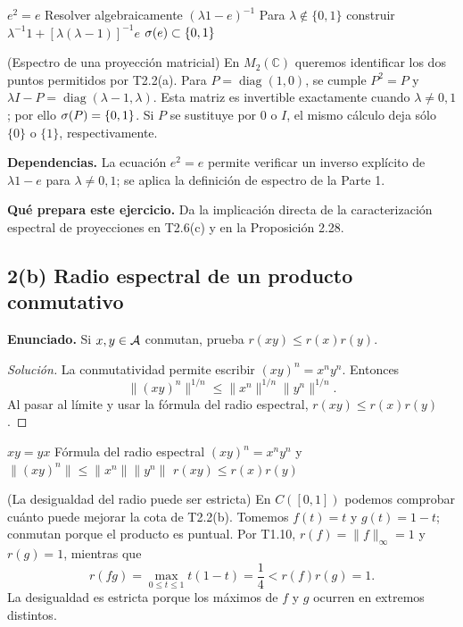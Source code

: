\pagebreak
\proofdiagram
{$e^2=e$}
{Resolver algebraicamente $(\lambda1-e)^{-1}$}
{Para $\lambda\notin\{0,1\}$ construir $\lambda^{-1}1+[\lambda(\lambda-1)]^{-1}e$}
{$\sigma(e)\subset\{0,1\}$}

\begin{cthejemplo}{(Espectro de una proyección matricial)}
En $M_2(\mathbb C)$ queremos identificar los dos puntos permitidos por T2.2(a).
Para $P=\operatorname{diag}(1,0)$, se cumple $P^2=P$ y
$\lambda I-P=\operatorname{diag}(\lambda-1,\lambda)$.
Esta matriz es invertible exactamente cuando $\lambda\ne0,1$; por ello
$\sigma(P)=\{0,1\}$. Si $P$ se sustituye por $0$ o $I$, el mismo cálculo deja sólo
$\{0\}$ o $\{1\}$, respectivamente.
\end{cthejemplo}

\noindent\textbf{Dependencias.} La ecuación $e^2=e$ permite verificar un inverso explícito de $\lambda1-e$ para $\lambda\ne0,1$; se aplica la definición de espectro de la Parte 1.

\noindent\textbf{Qué prepara este ejercicio.} Da la implicación directa de la caracterización espectral de proyecciones en T2.6(c) y en la Proposición 2.28.

\subsection*{2(b) Radio espectral de un producto conmutativo}

\noindent\textbf{Enunciado.} Si $x,y\in\mathcal A$ conmutan, prueba $r(xy)\le r(x)r(y)$.

\begin{proof}[Solución]
La conmutatividad permite escribir $(xy)^n=x^ny^n$. Entonces
\[
\|(xy)^n\|^{1/n}
\le\|x^n\|^{1/n}\|y^n\|^{1/n}.
\]
Al pasar al límite y usar la fórmula del radio espectral,
$r(xy)\le r(x)r(y)$.
\end{proof}

\proofdiagram
{$xy=yx$}
{Fórmula del radio espectral}
{$(xy)^n=x^ny^n$ y $\|(xy)^n\|\le\|x^n\|\|y^n\|$}
{$r(xy)\le r(x)r(y)$}

\begin{cthejemplo}{(La desigualdad del radio puede ser estricta)}
En $C([0,1])$ podemos comprobar cuánto puede mejorar la cota de T2.2(b).
Tomemos $f(t)=t$ y $g(t)=1-t$; conmutan porque el producto es puntual.
Por T1.10, $r(f)=\|f\|_\infty=1$ y $r(g)=1$, mientras que
\[
 r(fg)=\max_{0\le t\le1}t(1-t)=\frac14<r(f)r(g)=1.
\]
La desigualdad es estricta porque los máximos de $f$ y $g$ ocurren en extremos distintos.
\end{cthejemplo}

